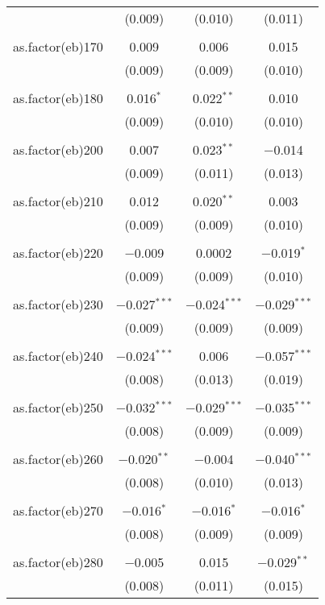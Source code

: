 \begin{table}[!htbp]
\begin{tabular}{@{\extracolsep{5pt}}lccc}
  & (0.009) & (0.010) & (0.011) \\ 
  & & & \\ 
 as.factor(eb)170 & 0.009 & 0.006 & 0.015 \\ 
  & (0.009) & (0.009) & (0.010) \\ 
  & & & \\ 
 as.factor(eb)180 & 0.016$^{*}$ & 0.022$^{**}$ & 0.010 \\ 
  & (0.009) & (0.010) & (0.010) \\ 
  & & & \\ 
 as.factor(eb)200 & 0.007 & 0.023$^{**}$ & $-$0.014 \\ 
  & (0.009) & (0.011) & (0.013) \\ 
  & & & \\ 
 as.factor(eb)210 & 0.012 & 0.020$^{**}$ & 0.003 \\ 
  & (0.009) & (0.009) & (0.010) \\ 
  & & & \\ 
 as.factor(eb)220 & $-$0.009 & 0.0002 & $-$0.019$^{*}$ \\ 
  & (0.009) & (0.009) & (0.010) \\ 
  & & & \\ 
 as.factor(eb)230 & $-$0.027$^{***}$ & $-$0.024$^{***}$ & $-$0.029$^{***}$ \\ 
  & (0.009) & (0.009) & (0.009) \\ 
  & & & \\ 
 as.factor(eb)240 & $-$0.024$^{***}$ & 0.006 & $-$0.057$^{***}$ \\ 
  & (0.008) & (0.013) & (0.019) \\ 
  & & & \\ 
 as.factor(eb)250 & $-$0.032$^{***}$ & $-$0.029$^{***}$ & $-$0.035$^{***}$ \\ 
  & (0.008) & (0.009) & (0.009) \\ 
  & & & \\ 
 as.factor(eb)260 & $-$0.020$^{**}$ & $-$0.004 & $-$0.040$^{***}$ \\ 
  & (0.008) & (0.010) & (0.013) \\ 
  & & & \\ 
 as.factor(eb)270 & $-$0.016$^{*}$ & $-$0.016$^{*}$ & $-$0.016$^{*}$ \\ 
  & (0.008) & (0.009) & (0.009) \\ 
  & & & \\ 
 as.factor(eb)280 & $-$0.005 & 0.015 & $-$0.029$^{**}$ \\ 
  & (0.008) & (0.011) & (0.015) \\ 

\end{tabular}
\end{table}
